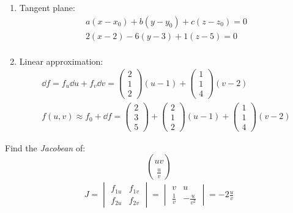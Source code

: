 \documentclass[00_complete]{subfiles}
\begin{document}
\begin{example}
\begin{enumerate}
        \item Tangent plane:
            \begin{gather*}
                a(x-x_0)+b(y-y_0)+c(z-z_0)=0 \\
                2(x-2)-6(y-3)+1(z-5)=0 \\
            \end{gather*}
        \item Linear approximation:
            \begin{gather*}
                \dd{f}=f_u\dd{u}+ f_v\dd{v} = \begin{pmatrix}
                    2\\1\\2
                \end{pmatrix}(u-1) + \begin{pmatrix}
                    1\\1\\4
                \end{pmatrix}(v-2) \\
                f(u,v) \approx f_0 + \dd{f} = \begin{pmatrix}
                    2\\3\\5
                \end{pmatrix}+\begin{pmatrix}
                    2\\1\\2
                \end{pmatrix}(u-1)+\begin{pmatrix}
                    1\\1\\4
                \end{pmatrix}(v-2)
            \end{gather*}
    \end{enumerate}
\end{example}
\begin{example}
    Find the \emph{Jacobean} of:
    $$\binom{uv}{\frac{u}{v}}$$
    \begin{gather*}
        J=\begin{vmatrix}
            f_{1u} & f_{1v} \\ f_{2u} & f_{2v}
        \end{vmatrix} = \begin{vmatrix}
            v & u \\ \frac{1}{v} & -\frac{u}{v^2}
        \end{vmatrix} = -2\frac{u}{v}
    \end{gather*}
\end{example}
\end{document}
